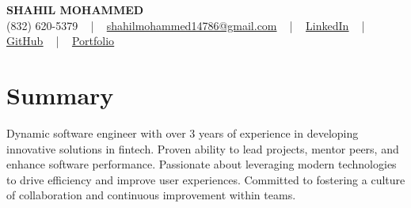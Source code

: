 \documentclass[letterpaper,10pt]{article}
\begin{document}
\begin{center}
    {\fontsize{14pt}{12pt}\selectfont \textbf{\MakeUppercase{Shahil Mohammed}}}\\ \vspace{2pt}
    \fontsize{10pt}{12pt}\selectfont (832) 620-5379 ~ | ~ \href{mailto:shahilmohammed14786@gmail.com}{shahilmohammed14786@gmail.com} ~ | ~  
    \href{https://www.linkedin.com/in/shahil-mohammed-9652931a1/}{\color{blue}\underline{LinkedIn}}  ~ | ~ 
    \href{https://github.com/freakbeast14}{\color{blue}\underline{GitHub}} ~ | ~ 
    \href{https://shahil-mohammed.netlify.app/}{\color{blue}\underline{Portfolio}}
    \vspace{-8pt}
\end{center}

\section{Summary}
\vspace{-2pt}\fontsize{8pt}{9pt}\selectfont
Dynamic software engineer with over 3 years of experience in developing innovative solutions in fintech. Proven ability to lead projects, mentor peers, and enhance software performance. Passionate about leveraging modern technologies to drive efficiency and improve user experiences. Committed to fostering a culture of collaboration and continuous improvement within teams.
 \vspace{-5pt}
 
\vspace{-2pt}
\end{document}
